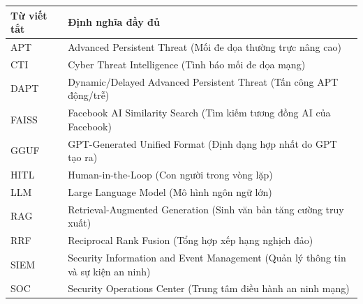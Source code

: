 \documentclass[12pt,a4paper]{report}
\begin{document}
\begin{longtable}{lp{}}
\textbf{Từ viết tắt} & \textbf{Định nghĩa đầy đủ} \\
\midrule
APT & Advanced Persistent Threat (Mối đe dọa thường trực nâng cao) \\
CTI & Cyber Threat Intelligence (Tình báo mối đe dọa mạng) \\
DAPT & Dynamic/Delayed Advanced Persistent Threat (Tấn công APT động/trễ) \\
FAISS & Facebook AI Similarity Search (Tìm kiếm tương đồng AI của Facebook) \\
GGUF & GPT-Generated Unified Format (Định dạng hợp nhất do GPT tạo ra) \\
HITL & Human-in-the-Loop (Con người trong vòng lặp) \\
LLM & Large Language Model (Mô hình ngôn ngữ lớn) \\
RAG & Retrieval-Augmented Generation (Sinh văn bản tăng cường truy xuất) \\
RRF & Reciprocal Rank Fusion (Tổng hợp xếp hạng nghịch đảo) \\
SIEM & Security Information and Event Management (Quản lý thông tin và sự kiện an ninh) \\
SOC & Security Operations Center (Trung tâm điều hành an ninh mạng) \\
\bottomrule
\end{longtable}
\newpage
\tableofcontents

\newpage
\onehalfspacing %

\setcounter{table}{0}
\setcounter{figure}{0}






\newpage
\singlespacing %
\end{document}
